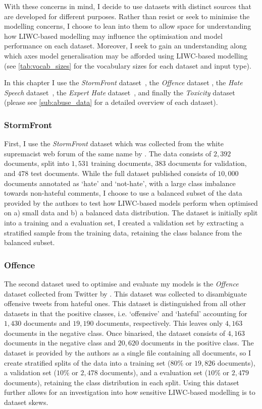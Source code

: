 With these concerns in mind, I decide to use datasets with distinct sources that are developed for different purposes.
Rather than resist or seek to minimise the modelling concerns, I choose to lean into them to allow space for understanding how LIWC-based modelling may influence the optimisation and model performance on each dataset.
Moreover, I seek to gain an understanding along which axes model generalisation may be afforded using LIWC-based modelling (see \cref{tab:vocab_sizes} for the vocabulary sizes for each dataset and input type).

In this chapter I use the \textit{StormFront} dataset~\citep{Garcia:2019}, the \textit{Offence} dataset \citep{Davidson:2017}, the \textit{Hate Speech} dataset~\citep{Waseem-Hovy:2016}, the \textit{Expert Hate} dataset~\citep{Waseem:2016}, and finally the \textit{Toxicity} dataset~\citep{Wulczyn:2017} (please see \cref{sub:abuse_data} for a detailed overview of each dataset).

\subsubsection{StormFront}
First, I use the \textit{StormFront} dataset which was collected from the white supremacist web forum of the same name by \citet{Garcia:2019}.
The data consists of $2,392$ documents, split into $1,531$ training documents, $383$ documents for validation, and $478$ test documents.
While the full dataset published consists of $10,000$ documents annotated as `hate' and `not-hate', with a large class imbalance towards non-hateful comments, I choose to use a balanced subset of the data provided by the authors to test how LIWC-based models perform when optimised on a) small data and b) a balanced data distribution.
The dataset is initially split into a training and a evaluation set, I created a validation set by extracting a stratified sample from the training data, retaining the class balance from the balanced subset.

\subsubsection{Offence}
The second dataset used to optimise and evaluate my models is the \textit{Offence} dataset collected from Twitter by \citet{Davidson:2017}.
This dataset was collected to disambiguate offensive tweets from hateful ones.
This dataset is distinguished from all other datasets in that the positive classes, i.e. `offensive' and `hateful' accounting for $1,430$ documents and $19,190$ documents, respectively.
This leaves only $4,163$ documents in the negative class. 
Once binarised, the dataset consists of $4,163$ documents in the negative class and $20,620$ documents in the positive class.
The dataset is provided by the authors as a single file containing all documents, so I create stratified splits of the data into a training set ($80\%$ or $19,826$ documents), a validation set ($10\%$ or $2,478$ documents), and a evaluation set ($10\%$ or $2,479$ documents), retaining the class distribution in each split.
Using this dataset further allows for an investigation into how sensitive LIWC-based modelling is to dataset skews.

